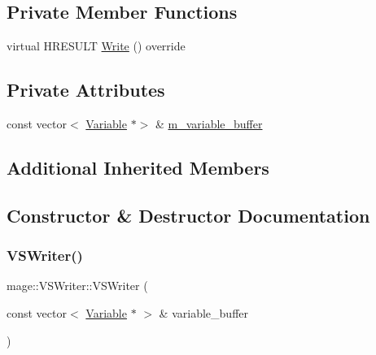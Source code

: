 \subsection*{Private Member Functions}
\begin{DoxyCompactItemize}
\item 
virtual H\+R\+E\+S\+U\+LT \hyperlink{classmage_1_1_v_s_writer_a1d106607f69bbd5989a259bbf60262fb}{Write} () override
\end{DoxyCompactItemize}
\subsection*{Private Attributes}
\begin{DoxyCompactItemize}
\item 
const vector$<$ \hyperlink{structmage_1_1_variable}{Variable} $\ast$$>$ \& \hyperlink{classmage_1_1_v_s_writer_a4fa655fa7c7d09a9439a22061ceab0f4}{m\+\_\+variable\+\_\+buffer}
\end{DoxyCompactItemize}
\subsection*{Additional Inherited Members}


\subsection{Constructor \& Destructor Documentation}
\hypertarget{classmage_1_1_v_s_writer_a401e3661cf197c20a011792221443e8f}{}\label{classmage_1_1_v_s_writer_a401e3661cf197c20a011792221443e8f} 
\subsubsection{\texorpdfstring{V\+S\+Writer()}{VSWriter()}\hspace{0.1cm}{\footnotesize\ttfamily [1/3]}}
{\footnotesize\ttfamily mage\+::\+V\+S\+Writer\+::\+V\+S\+Writer (\begin{DoxyParamCaption}\item[{const vector$<$ \hyperlink{structmage_1_1_variable}{Variable} $\ast$ $>$ \&}]{variable\+\_\+buffer }\end{DoxyParamCaption})\hspace{0.3cm}{\ttfamily [explicit]}}

\hypertarget{classmage_1_1_v_s_writer_a77d146f812d9d37ee99c31133d3597b8}{}\label{classmage_1_1_v_s_writer_a77d146f812d9d37ee99c31133d3597b8} 
